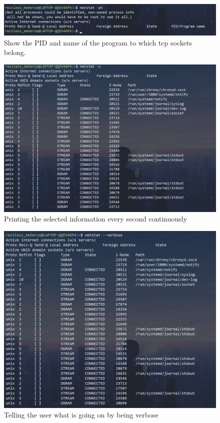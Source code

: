 \documentclass[11pt]{article}
\begin{document}
\begin{figure}[H]
	\centering
	\includegraphics[width=\textwidth]{res/netstat 12.png}
	\caption{Show the PID and name of the program to which tcp sockets belong.}
\end{figure}
\begin{figure}[H]
	\centering
	\includegraphics[width=\textwidth]{res/netstat 13.png}
	\caption{Printing the selected information every second continuously}
\end{figure}
\begin{figure}[H]
	\centering
	\includegraphics[width=\textwidth]{res/netstat 14.png}
	\caption{Telling the user what is going on by being verbose}
\end{figure}
	
\end{document}
